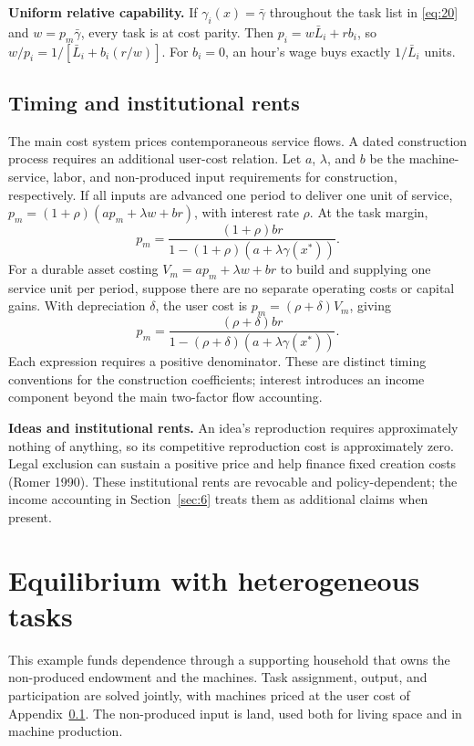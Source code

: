 \documentclass[12pt]{article}
\theoremstyle{plain}
\begin{document}
\textbf{Uniform relative capability.} If $\gamma_i(x)=\bar{\gamma}$ throughout the task list in \eqref{eq:20} and $w=p_m\bar{\gamma}$, every task is at cost parity. Then $p_i=w\bar{L}_i+rb_i$, so $w/p_i=1/[\bar{L}_i+b_i(r/w)]$. For $b_i=0$, an hour's wage buys exactly $1/\bar{L}_i$ units.

\subsection{Timing and institutional rents}\label{app:A.4}

The main cost system prices contemporaneous service flows. A dated construction process requires an additional user-cost relation. Let $a$, $\lambda$, and $b$ be the machine-service, labor, and non-produced input requirements for construction, respectively. If all inputs are advanced one period to deliver one unit of service, $p_m=(1+\rho)(ap_m+\lambda w+br)$, with interest rate $\rho$. At the task margin,
\[
p_m=\frac{(1+\rho)br}{1-(1+\rho)(a+\lambda\gamma(x^*))}.
\]
For a durable asset costing $V_m=ap_m+\lambda w+br$ to build and supplying one service unit per period, suppose there are no separate operating costs or capital gains. With depreciation $\delta$, the user cost is $p_m=(\rho+\delta)V_m$, giving
\[
p_m=\frac{(\rho+\delta)br}{1-(\rho+\delta)(a+\lambda\gamma(x^*))}.
\]
Each expression requires a positive denominator. These are distinct timing conventions for the construction coefficients; interest introduces an income component beyond the main two-factor flow accounting.

\textbf{Ideas and institutional rents.} An idea's reproduction requires approximately nothing of anything, so its competitive reproduction cost is approximately zero. Legal exclusion can sustain a positive price and help finance fixed creation costs (Romer 1990). These institutional rents are revocable and policy-dependent; the income accounting in Section~\ref{sec:6} treats them as additional claims when present.

\section{Equilibrium with heterogeneous tasks}\label{app:B}

This example funds dependence through a supporting household that owns the non-produced endowment and the machines. Task assignment, output, and participation are solved jointly, with machines priced at the user cost of Appendix~\ref{app:A.4}. The non-produced input is land, used both for living space and in machine production.
\end{document}
